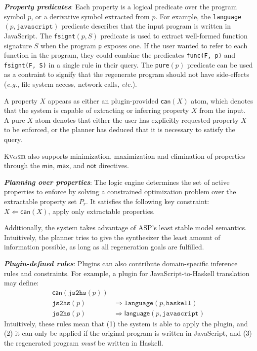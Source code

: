 \documentclass[nonacm,sigplan]{acmart}
\def\eg{{\em e.g.}, }
\def\etc{{\em etc.}\xspace}
\newcommand{\sys}{{\scshape Kv{$\alpha$}sir}\xspace}
\newcommand{\heading}[1]{\vspace{2pt}\noindent\textbf{\emph{#1}}:\enspace}
\newcommand{\ttt}[1]{\texttt{#1}\xspace}
\begin{document}



\heading{Property predicates}
Each property is a logical predicate over the program symbol $p$,
or a derivative symbol extracted from $p$.
For example, 
the \ttt{language}$(p, \ttt{javascript})$ predicate describes that the input program is written in JavaScript.
The \ttt{fsignt}$(p, S)$ predicate is used to extract well-formed function signature $S$ when the program \ttt{p} exposes one.
If the user wanted to refer to each function in the program, they could 
combine the predicates \ttt{func(F, p)} and \ttt{fsignt(F, S)} in a single rule in their query.
The \ttt{pure}$(p)$ predicate can be used as a contraint
to signify that the regenerate program
should not have side-effects (\eg file system access, network calls, \etc).

A property $X$ appears as either an
  plugin-provided $\mathsf{can}(X)$ atom, which denotes that the system is capable of extracting or inferring property $X$ from the input.
  A pure $X$ atom denotes that either the user has explicitly requested property $X$ to be enforced, or the planner has deduced that it is necessary to satisfy the query.

\sys also supports minimization, maximization and elimination of properties
through the $\mathsf{min}$, $\mathsf{max}$, and $\mathsf{not}$ directives.

\heading{Planning over properties}
The logic engine determines the set of active properties to enforce by solving
a constrained optimization problem over the extractable property set $P_r$.
It satisfies the
following key constraint:
  $X \Leftarrow \mathsf{can}(X)$, apply only extractable properties.

Additionally, the system takes advantage of ASP's least stable model semantics.
Intuitively, the planner tries to give the synthesizer the least amount of information
possible, as long as all regeneration goals are fulfilled.

\heading{Plugin-defined rules}
Plugins can also contribute domain-specific inference rules and constraints.
For example, a plugin for JavaScript-to-Haskell translation may define:
\begin{align*}
\mathsf{can}(\ttt{js2hs}(p)) & \\
\ttt{js2hs}(p) &\Rightarrow \ttt{language}(p, \ttt{haskell}) \\
\ttt{js2hs}(p) &\Rightarrow \mathsf{language}(p, \ttt{javascript})
\end{align*}
Intuitively, these rules mean that 
(1) the system is able to apply the plugin,
and (2) it can only be applied if the original program is written in JavaScript, 
and (3) the regenerated program \emph{must} be written in Haskell.
\end{document}
